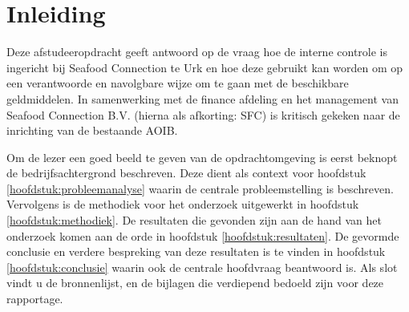 \chapter*{Inleiding} %
Deze afstudeeropdracht geeft antwoord op de vraag hoe de interne controle is ingericht bij Seafood Connection te Urk en hoe deze gebruikt kan worden om op een verantwoorde en navolgbare wijze om te gaan met de beschikbare geldmiddelen. In samenwerking met de finance afdeling en het management van Seafood Connection B.V. (hierna als afkorting: SFC) is kritisch gekeken naar de inrichting van de bestaande AOIB. 

Om de lezer een goed beeld te geven van de opdrachtomgeving is eerst beknopt de bedrijfsachtergrond beschreven. 
Deze dient als context voor hoofdstuk \ref{hoofdstuk:probleemanalyse} waarin de centrale probleemstelling is beschreven. Vervolgens is de methodiek voor het onderzoek uitgewerkt in hoofdstuk \ref{hoofdstuk:methodiek}. De resultaten die gevonden zijn aan de hand van het onderzoek komen aan de orde in hoofdstuk \ref{hoofdstuk:resultaten}. De gevormde conclusie en verdere bespreking van deze resultaten is te vinden in hoofdstuk \ref{hoofdstuk:conclusie} waarin ook de centrale hoofdvraag beantwoord is. Als slot vindt u de bronnenlijst, en de bijlagen die verdiepend bedoeld zijn voor deze rapportage. 